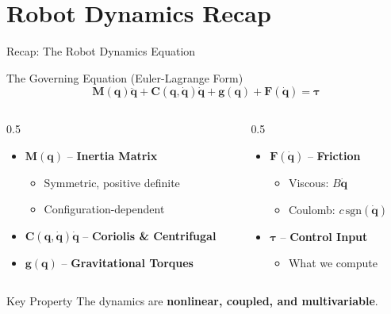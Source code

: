 \documentclass[10pt]{beamer}
\newcommand{\vect}[1]{\boldsymbol{#1}}
\newcommand{\M}{\vect{M}}
\newcommand{\C}{\vect{C}}
\newcommand{\g}{\vect{g}}
\newcommand{\q}{\vect{q}}
\newcommand{\qdot}{\dot{\vect{q}}}
\newcommand{\qddot}{\ddot{\vect{q}}}
\newcommand{\tauvec}{\vect{\tau}}
\begin{document}
\section{Robot Dynamics Recap}
\begin{frame}{Recap: The Robot Dynamics Equation}
    \begin{block}{The Governing Equation (Euler-Lagrange Form)}
        \[
        \M(\q)\qddot + \C(\q, \qdot)\qdot + \g(\q) + \vect{F}(\qdot) = \tauvec
        \]
    \end{block}
    
    \begin{columns}
        \begin{column}{0.5\textwidth}
            \begin{itemize}
                \item $\M(\q)$ -- \textbf{Inertia Matrix}
                \begin{itemize}
                    \footnotesize
                    \item Symmetric, positive definite
                    \item Configuration-dependent
                \end{itemize}
                \item $\C(\q, \qdot)\qdot$ -- \textbf{Coriolis \& Centrifugal}
                \item $\g(\q)$ -- \textbf{Gravitational Torques}
            \end{itemize}
        \end{column}
        \begin{column}{0.5\textwidth}
            \begin{itemize}
                \item $\vect{F}(\qdot)$ -- \textbf{Friction}
                \begin{itemize}
                    \footnotesize
                    \item Viscous: $B\qdot$
                    \item Coulomb: $c\,\text{sgn}(\qdot)$
                \end{itemize}
                \item $\tauvec$ -- \textbf{Control Input}
                \begin{itemize}
                    \footnotesize
                    \item What we compute
                \end{itemize}
            \end{itemize}
        \end{column}
    \end{columns}
    
    \vspace{3mm}
    \begin{alertblock}{Key Property}
        The dynamics are \textbf{nonlinear, coupled, and multivariable}.
    \end{alertblock}
\end{frame}
\end{document}
